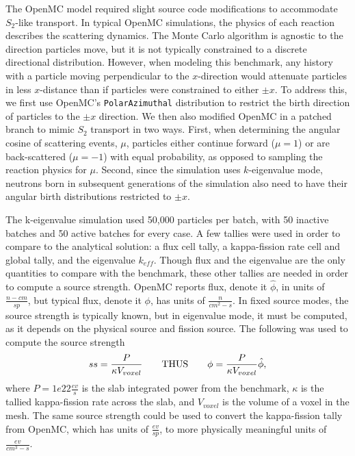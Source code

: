 \documentclass[letterpaper]{mc2023}
\begin{document}
The OpenMC model required slight source code modifications to accommodate $S_2$-like transport. In typical OpenMC simulations,
the physics of each reaction describes the scattering dynamics. The Monte Carlo algorithm is agnostic to the direction
particles move, but it is not typically constrained to a discrete directional distribution. However, when modeling this
benchmark, any history with a particle moving perpendicular to the $x$-direction would attenuate particles in less
$x$-distance than if particles were constrained to either $\pm x$. To address this, we first use OpenMC's \texttt{PolarAzimuthal}
distribution to restrict the birth direction of particles to the $\pm x$ direction. We then also modified OpenMC in a
patched branch to mimic $S_{2}$ transport in two ways. First, when determining the angular cosine of scattering events,
$\mu$, particles either continue forward ($\mu=1$) or are back-scattered ($\mu=-1$) with equal probability, as opposed to
sampling the reaction physics for $\mu$. Second, since the simulation uses $k$-eigenvalue mode, neutrons born in subsequent
generations of the simulation also need to have their angular birth distributions restricted to $\pm x$.

The k-eigenvalue simulation used 50,000 particles per batch, with 50 inactive batches and 50 active batches for every case. A few
tallies were used in order to compare to the analytical solution: a flux cell tally, a kappa-fission rate cell and global tally,
and the eigenvalue $k_{eff}$. Though flux and the eigenvalue are the only quantities to compare with the benchmark, these other
tallies are needed in order to compute a source strength. OpenMC reports flux, denote it $\hat{\phi}$, in units of $\frac{n-cm}{sp}$,
but typical flux, denote it $\phi$, has units of $\frac{n}{cm^2-s}$. In fixed source modes, the source strength is typically known,
but in eigenvalue mode, it must be computed, as it depends on the physical source and fission source. The following was used to
compute the source strength
\begin{equation} \label{eq:source_strength}
   ss = \frac{P}{\kappa V_{voxel}} \qquad \text{THUS} \qquad \phi = \frac{P}{\kappa V_{voxel} }\hat{\phi},
\end{equation}
where $P=1e22 \frac{ev}{s}$ is the slab integrated power from the benchmark, $\kappa$ is the tallied kappa-fission rate across the slab,
and $V_{voxel}$ is the volume of a voxel in the mesh. The same source strength could be used to convert the kappa-fission tally from
OpenMC, which has units of $\frac{ev}{sp}$, to more physically meaningful units of $\frac{ev}{cm^3-s}$.
\end{document}
